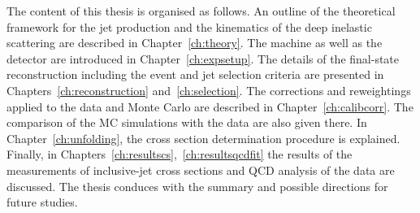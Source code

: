 The content of this thesis is organised as follows. An outline of the theoretical framework for the jet production and the kinematics of the deep inelastic scattering are described in Chapter~\ref{ch:theory}. The \hera machine as well as the \zeus detector are introduced in Chapter~\ref{ch:expsetup}. The details of the final-state reconstruction including the event and jet selection criteria are presented in Chapters~\ref{ch:reconstruction} and~\ref{ch:selection}. The corrections and reweightings applied to the data and Monte Carlo are described in Chapter~\ref{ch:calibcorr}. The comparison of the MC simulations with the data are also given there. In Chapter~\ref{ch:unfolding}, the cross section determination procedure is explained. Finally, in Chapters~\ref{ch:resultscs},~\ref{ch:resultsqcdfit} the results of the measurements of inclusive-jet cross sections and QCD analysis of the data are discussed. The thesis conduces with the summary and possible directions for future studies.